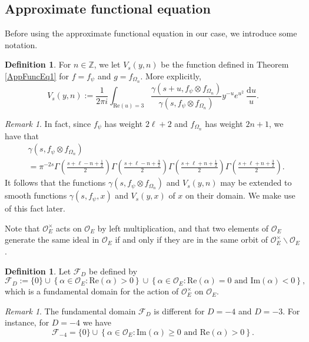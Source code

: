 \documentclass[11pt]{amsart}
\newcommand{\bigo}{\mathcal{O}}
\newcommand{\Z}{\mathbb{Z}}
\theoremstyle{definition}
\newtheorem{definition}[theorem]{Definition}
\theoremstyle{remark}
\newtheorem{remark}[theorem]{Remark}
\begin{document}
\subsection{Approximate functional equation}

Before using the approximate functional equation in our case, we introduce some notation. 

\begin{definition}\label{DefVs}
For $n\in \Z$, we let $V_s(y,n)$ be the function defined in Theorem \ref{AppFuncEq1} for $f=f_{\psi}$ and $g=f_{\Omega_n}$. More explicitly, $$ V_s(y,n) := \frac{1}{2\pi i} \int_{\mathrm{Re}(u)=3} \frac{\gamma(s+u,f_{\psi}\otimes f_{\Omega_n})}{\gamma(s,f_{\psi}\otimes f_{\Omega_n})} y^{-u} e^{u^2} \: \frac{\mathrm{d}u}{u}.$$
\end{definition}

\begin{remark}\label{VsynSmoothWRTn}
In fact, since $f_{\psi}$ has weight $2\ell+2$ and $f_{\Omega_n}$ has weight $2n+1$, we have that 
\begin{align*}
    &\gamma(s,f_{\psi}\otimes f_{\Omega_n}) \\
    &= \pi^{-2s} \Gamma\left( \frac{s+\ell-n+\frac{1}{2}}{2} \right) \Gamma\left( \frac{s+\ell-n+\frac{3}{2}}{2} \right) \Gamma\left( \frac{s+\ell+n+\frac{1}{2}}{2} \right) \Gamma\left( \frac{s+\ell+n+\frac{3}{2}}{2} \right).
\end{align*}
It follows that the functions $\gamma(s,f_{\psi} \otimes f_{\Omega_n})$ and $V_{s}(y,n)$ may be extended to smooth functions $\gamma(s,f_{\psi},x)$ and $V_{s}(y,x)$ of $x$ on their domain. We make use of this fact later.
\end{remark}

Note that $\bigo_{E}^{\times}$ acts on $\bigo_{E}$ by left multiplication, and that two elements of $\bigo_{E}$ generate the same ideal in $\bigo_{E}$ if and only if they are in the same orbit of $\bigo_{E}^{\times} \backslash \bigo_{E}$.

\begin{definition}
Let $\mathcal{F}_{D}$ be defined by $$ \mathcal{F}_{D} := \{0\} \cup \left\{ \alpha \in \bigo_{E} : \mathrm{Re}(\alpha) > 0 \right\} \cup \left\{ \alpha \in \bigo_{E} : \mathrm{Re}(\alpha)=0 \text{ and } \mathrm{Im}(\alpha) <0 \right\},$$ which is a fundamental domain for the action of $\bigo_{E}^{\times}$ on $\bigo_{E}$.
\end{definition}

\begin{remark}
The fundamental domain $\mathcal{F}_{D}$ is different for $D=-4$ and $D=-3$. For instance, for $D=-4$ we have $$ \mathcal{F}_{-4} = \{0\} \cup \left\{ \alpha \in \bigo_{E} : \mathrm{Im}(\alpha) \geq 0 \text{ and } \mathrm{Re}(\alpha) >0 \right\}.$$
\end{remark}
\end{document}
